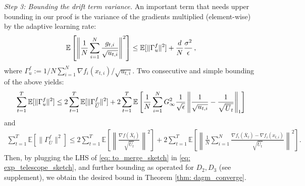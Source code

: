 \documentclass{article} %
\begin{document}
\textsl{Step 3: Bounding the drift term variance.}\hspace{0.01in} An important term that needs upper bounding in our proof is the variance of the gradients multiplied (element-wise) by the adaptive learning rate:
 {\small 
 \begin{align}\notag
 \mathbb E\left[ \left\| \frac{1}{N} \sum_{i=1}^N \frac{g_{t,i}}{\sqrt{u_{t,i}}} \right\|^2 \right]  \leq   \mathbb E [\| \Gamma_{u}^f\|^2 ] + \frac{d}{N}  
 \frac{ \sigma^2 }{\epsilon} \, ,
 \end{align}
 }%
 where $ \Gamma_{u}^f := 1/N \sum_{i=1}^N \nabla f_i(x_{t,i})/\sqrt{u_{t,i}} $. Two consecutive and simple bounding of the above yields:
 {\small
 \begin{align}\notag
 \sum_{t=1}^T \mathbb E [  \|\Gamma_{u}^f\|^2 ]  
  \leq  2\sum_{t=1}^T \mathbb E [\|\Gamma_{\overline{U}}^f \|^2] + 2 \sum_{t=1}^T \mathbb E \left[  \frac{1}{N} \sum_{i=1}^N G_{\infty}^2  \frac{1}{\sqrt{\epsilon}}\left\|     \frac{1}{\sqrt{u_{t,i}}} - \frac{1}{\sqrt{\overline U_{t}}}  \right\|_1     \right]
 \end{align}
 }%
 and
 {\small
 \begin{align}\label{eq: to_merge_sketch}
 \sum_{t=1}^T \mathbb E [\|\Gamma_{\overline{U}}^f \|^2]  
 \leq  2 \sum_{t=1}^T \mathbb E \left[  \left\| \frac{\nabla f(\overline X_{t})}{\sqrt{\overline U_t}  } \right\|^2 \right] 
+ 2 \sum_{t=1}^T \mathbb E \left[  \left\|\frac{1}{N} \sum_{i=1}^N \frac{\nabla f_i(\overline X_t) - \nabla f_i(x_{t,i})}{\sqrt{\overline U_t}  } \right\|^2 \right].
 \end{align}
 }%
Then, by plugging the LHS of \eqref{eq: to_merge_sketch} in \eqref{eq: exp_telescope_sketch}, and further bounding as operated for $D_2, D_3$ (see supplement), we obtain the desired bound in Theorem \ref{thm: dagm_converge}.
\end{document}
